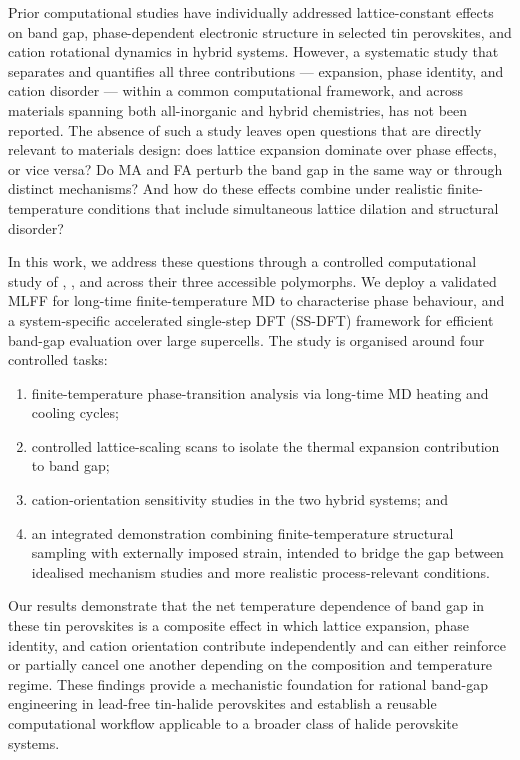 Prior computational studies have individually addressed
lattice-constant effects on band gap,\cite{huang2013electronic}
phase-dependent electronic structure in selected tin
perovskites,\cite{stoumpos2013semiconducting} and cation rotational
dynamics in hybrid systems.\cite{maheshwari2019relation, hautzinger2024asite}
However, a systematic study that separates and quantifies all three
contributions --- expansion, phase identity, and cation disorder ---
within a common computational framework, and across materials
spanning both all-inorganic and hybrid chemistries, has not been
reported.
The absence of such a study leaves open questions that are directly
relevant to materials design: does lattice expansion dominate over
phase effects, or vice versa?
Do MA and FA perturb the band gap in the same way or through
distinct mechanisms?
And how do these effects combine under realistic finite-temperature
conditions that include simultaneous lattice dilation and structural
disorder?

In this work, we address these questions through a controlled
computational study of \CsSnI{}, \MASnI{}, and \FASnI{} across
their three accessible polymorphs.
We deploy a validated MLFF for long-time finite-temperature MD to
characterise phase behaviour, and a system-specific accelerated
single-step DFT (SS-DFT) framework for efficient band-gap evaluation
over large supercells.
The study is organised around four controlled tasks:
\begin{enumerate}
  \item finite-temperature phase-transition analysis via long-time
        MD heating and cooling cycles;
  \item controlled lattice-scaling scans to isolate the thermal
        expansion contribution to band gap;
  \item cation-orientation sensitivity studies in the two hybrid
        systems; and
  \item an integrated demonstration combining finite-temperature
        structural sampling with externally imposed strain, intended
        to bridge the gap between idealised mechanism studies and
        more realistic process-relevant conditions.
\end{enumerate}

Our results demonstrate that the net temperature dependence of band
gap in these tin perovskites is a composite effect in which lattice
expansion, phase identity, and cation orientation contribute
independently and can either reinforce or partially cancel one another
depending on the composition and temperature regime.
These findings provide a mechanistic foundation for rational
band-gap engineering in lead-free tin-halide perovskites and
establish a reusable computational workflow applicable to a broader
class of halide perovskite systems.
